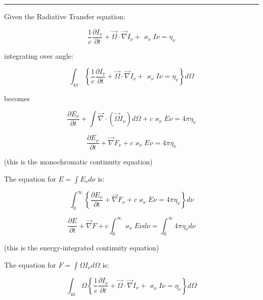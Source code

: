 \documentclass{template}
\begin{document}
\hrule

Given the Radiative Transfer equation:

\begin{equation}
    \frac{1}{c}\frac{\partial I_\nu}{\partial t} + \vec{\Omega}\cdot\vec{\nabla}I_\nu + \varkappa_\nu I\nu = \eta_\nu
\end{equation}

integrating over angle:

\begin{equation}
    \int_{4\pi} {\left\{\frac{1}{c}\frac{\partial I_\nu}{\partial t} + \vec{\Omega}\cdot\vec{\nabla}I_\nu + \varkappa_\nu I\nu = \eta_\nu\right\}} d\Omega
\end{equation}

becomes

\begin{equation}
    \frac{\partial E_\nu}{\partial t} + \int{\vec{\nabla}\cdot\left(\vec{\Omega} I_\nu\right)} d\Omega + c\varkappa_\nu E\nu =  4\pi \eta_\nu
\end{equation}

\begin{equation}
    \boxed{\frac{\partial E_\nu}{\partial t} + \vec{\nabla}F_\nu + c\varkappa_\nu E\nu = 4\pi \eta_\nu}
\end{equation}

(this is the monochromatic continuity equation)

The equation for $E = \int E_\nu d\nu$ is:

\begin{equation}
    \int_0^\infty \left\{\frac{\partial E_\nu}{\partial t} + \vec{\nabla}F_\nu + c\varkappa_\nu E\nu = 4\pi \eta_\nu\right\} d\nu
\end{equation}

\begin{equation}
    \boxed{\frac{\partial E}{\partial t} + \vec{\nabla}F + c  \int_0^\infty {\varkappa_\nu E\nu d\nu}=  \int_0^\infty{4\pi\eta_\nu d\nu}}
\end{equation}

(this is the energy-integrated continuity equation)

The equation for $F = \int \Omega I_\nu d\Omega $ is:

\begin{equation}
    \int_{4\pi} \Omega {\left\{\frac{1}{c}\frac{\partial I_\nu}{\partial t} + \vec{\Omega}\cdot\vec{\nabla}I_\nu + \varkappa_\nu I\nu = \eta_\nu\right\}} d\Omega
\end{equation}
\end{document}
